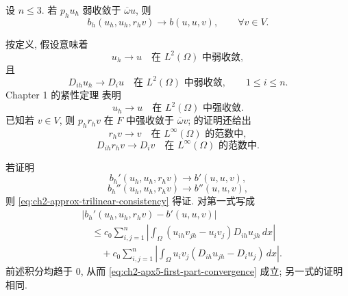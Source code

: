\begin{Lemma}
\label{lem:ch2-apx5-trilinear-convergence}
设 $n\leq3$. 若 $p_hu_h$ 弱收敛于 $\overline\omega u$, 则
\begin{equation}
b_h(u_h,u_h,r_hv)\longrightarrow b(u,u,v),
\qquad\forall v\in V.
\label{eq:ch2-apx5-trilinear-convergence}
\end{equation}
\end{Lemma}

\begin{Proof}
按定义, 假设意味着
\begin{equation}
u_h\longrightarrow u\quad\text{在 }L^2(\Omega)\text{ 中弱收敛},
\label{eq:ch2-apx5-weak-l2}
\end{equation}
且
\begin{equation}
D_{ih}u_h\longrightarrow D_iu
\quad\text{在 }L^2(\Omega)\text{ 中弱收敛},
\qquad1\leq i\leq n.
\label{eq:ch2-apx5-weak-derivatives}
\end{equation}
Chapter 1 的紧性定理  表明
\begin{equation}
u_h\longrightarrow u\quad\text{在 }L^2(\Omega)\text{ 中强收敛}.
\label{eq:ch2-apx5-strong-l2}
\end{equation}
已知若 $v\in V$, 则 $p_hr_hv$ 在 $F$ 中强收敛于 $\overline\omega v$;  的证明还给出
\begin{equation}
r_hv\longrightarrow v\quad\text{在 }L^\infty(\Omega)\text{ 的范数中},
\label{eq:ch2-apx5-lift-uniform}
\end{equation}
\begin{equation}
D_{ih}r_hv\longrightarrow D_iv\quad\text{在 }L^\infty(\Omega)\text{ 的范数中}.
\label{eq:ch2-apx5-lift-derivative-uniform}
\end{equation}

\hypertarget{chapter-02-page-160}{}
若证明
\begin{equation}
b_h'(u_h,u_h,r_hv)\longrightarrow b'(u,u,v),
\label{eq:ch2-apx5-first-part-convergence}
\end{equation}
\begin{equation}
b_h''(u_h,u_h,r_hv)\longrightarrow b''(u,u,v),
\label{eq:ch2-apx5-second-part-convergence}
\end{equation}
则 \eqref{eq:ch2-approx-trilinear-consistency} 得证. 对第一式写成
\[
\begin{aligned}
&|b_h'(u_h,u_h,r_hv)-b'(u,u,v)|\\
&\quad\leq c_0\sum_{i,j=1}^{n}
\left|\int_\Omega(u_{ih}v_{jh}-u_iv_j)D_{ih}u_{jh}\,dx\right|\\
&\qquad+c_0\sum_{i,j=1}^{n}
\left|\int_\Omega u_iv_j(D_{ih}u_{jh}-D_iu_j)\,dx\right|.
\end{aligned}
\]
前述积分均趋于 $0$, 从而 \eqref{eq:ch2-apx5-first-part-convergence} 成立; 另一式的证明相同.
\end{Proof}

